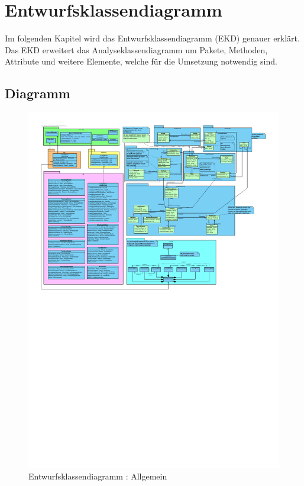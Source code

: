 \chapter{Entwurfsklassendiagramm}

Im folgenden Kapitel wird das Entwurfsklassendiagramm (EKD) genauer erklärt. Das EKD erweitert das Analyseklassendiagramm um Pakete, Methoden, Attribute und weitere Elemente, welche für die Umsetzung notwendig sind.

\section{Diagramm}

\begin{figure}[!ht]
    \centering
    \includegraphics[width=\textwidth, trim = 0cm 14cm 0cm 0cm]{Bilder/Diagramme/Entwurfsklassendiagramm_v2.pdf}
    \caption{Entwurfsklassendiagramm : Allgemein}
    \label{img:ekd}
\end{figure}

